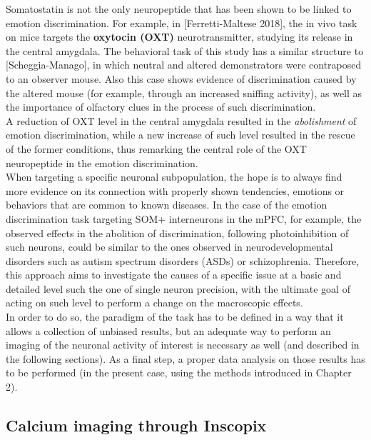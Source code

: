 \documentclass[12pt, a4paper]{article}
\begin{document}
Somatostatin is not the only neuropeptide that has been shown to be linked to emotion discrimination. For example, in [Ferretti-Maltese 2018], the in vivo task on mice targets the \textbf{oxytocin (OXT)} neurotransmitter, studying its release in the central amygdala. The behavioral task of this study has a similar structure to [Scheggia-Manago], in which neutral and altered demonstrators were contraposed to an observer mouse. Also this case shows evidence of  discrimination caused by the altered mouse (for example, through an increased sniffing activity), as well as the importance of olfactory clues in the process of such discrimination.\\
A reduction of  OXT level in the central amygdala resulted in the \textit{abolishment} of emotion discrimination, while a new increase of such level resulted in the rescue of the former conditions, thus remarking the central role of the OXT neuropeptide in the emotion discrimination.
\\

When targeting a specific neuronal subpopulation, the hope is to always find  more evidence on its connection with  properly shown tendencies, emotions or behaviors that are common to known diseases. In the case of the emotion discrimination task targeting SOM+ interneurons in the mPFC, for example, the observed effects in the abolition of discrimination, following photoinhibition of such neurons, could be similar to the ones observed in neurodevelopmental disorders such as autism spectrum disorders (ASDs) or schizophrenia. Therefore, this approach aims to investigate the causes of a specific issue at a basic and detailed level such the one of single neuron precision, with the ultimate goal of acting on such level to perform a change on the macroscopic effects.\\
In order to do so, the paradigm of the task has to be defined in a way that it allows a collection of unbiased results, but an adequate way to perform an imaging of the neuronal activity of interest is necessary as well (and described in the following sections). As a final step, a proper data analysis on those results has to be performed (in the present case, using the methods introduced in Chapter 2).


\subsection{Calcium imaging through Inscopix} \label{section 1.3}
\end{document}

